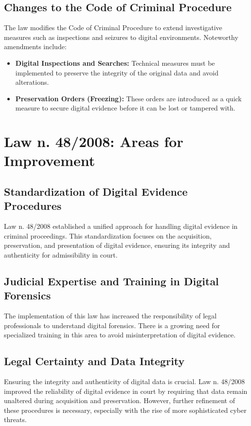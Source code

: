 \subsection{Changes to the Code of Criminal Procedure}
The law modifies the Code of Criminal Procedure to extend investigative measures such as inspections and seizures to digital environments. Noteworthy amendments include:
\begin{itemize}
    \item \textbf{Digital Inspections and Searches:} Technical measures must be implemented to preserve the integrity of the original data and avoid alterations.
    \item \textbf{Preservation Orders (Freezing):} These orders are introduced as a quick measure to secure digital evidence before it can be lost or tampered with.
\end{itemize}

\section{Law n. 48/2008: Areas for Improvement}

\subsection{Standardization of Digital Evidence Procedures}
Law n. 48/2008 established a unified approach for handling digital evidence in criminal proceedings. This standardization focuses on the acquisition, preservation, and presentation of digital evidence, ensuring its integrity and authenticity for admissibility in court.

\subsection{Judicial Expertise and Training in Digital Forensics}
The implementation of this law has increased the responsibility of legal professionals to understand digital forensics. There is a growing need for specialized training in this area to avoid misinterpretation of digital evidence.

\subsection{Legal Certainty and Data Integrity}
Ensuring the integrity and authenticity of digital data is crucial. Law n. 48/2008 improved the reliability of digital evidence in court by requiring that data remain unaltered during acquisition and preservation. However, further refinement of these procedures is necessary, especially with the rise of more sophisticated cyber threats.

